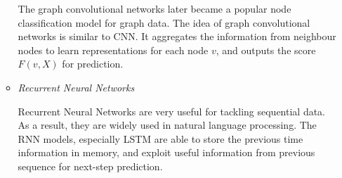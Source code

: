 \begin{enumerate}
\begin{itemize}
                        The graph convolutional networks later became a popular node classification model for graph data. The idea of graph convolutional networks is similar to CNN. It aggregates the information from neighbour nodes to learn representations for each node $v$, and outputs the score $F(v,X)$ for prediction.
                        
                        \item \textit{Recurrent Neural Networks}
                        
                        Recurrent Neural Networks are very useful for tackling sequential data. As a result, they are widely used in natural language processing. The RNN models, especially LSTM are able to store the previous time information in memory, and exploit useful information from previous sequence for next-step prediction.
                    \end{itemize}
            \end{enumerate}
